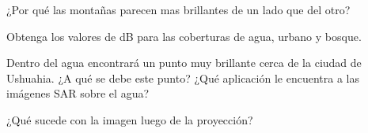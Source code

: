 \begin{que}
    ¿Por qué las montañas parecen mas brillantes de un lado que del otro?
\end{que}

\begin{que}
    Obtenga los valores de dB para las coberturas de agua, urbano y bosque.
\end{que}

\begin{que}
    Dentro del agua encontrará un punto muy brillante cerca de la ciudad de Ushuahia. ¿A qué se debe este punto? ¿Qué aplicación le encuentra a las imágenes SAR sobre el agua?
\end{que}

\begin{que}
    ¿Qué sucede con la imagen luego de la proyección?
\end{que}
